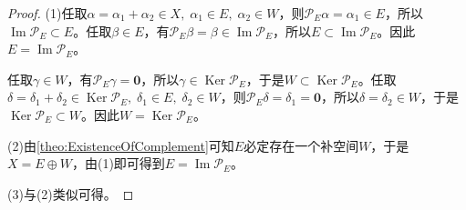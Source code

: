 \begin{proof}
	(1)任取$\alpha=\alpha_1+\alpha_2\in X,\;\alpha_1\in E,\;\alpha_2\in W$，则$\mathcal{P}_E\alpha=\alpha_1\in E$，所以$\operatorname{Im}\mathcal{P}_E\subset E$。任取$\beta\in E$，有$\mathcal{P}_E\beta=\beta\in\operatorname{Im}\mathcal{P}_E$，所以$E\subset\operatorname{Im}\mathcal{P}_E$。因此$E=\operatorname{Im}\mathcal{P}_E$。\par
	任取$\gamma\in W$，有$\mathcal{P}_E\gamma=\mathbf{0}$，所以$\gamma\in\operatorname{Ker}\mathcal{P}_E$，于是$W\subset\operatorname{Ker}\mathcal{P}_E$。任取$\delta=\delta_1+\delta_2\in\operatorname{Ker}\mathcal{P}_E,\;\delta_1\in E,\;\delta_2\in W$，则$\mathcal{P}_E\delta=\delta_1=\mathbf{0}$，所以$\delta=\delta_2\in W$，于是$\operatorname{Ker}\mathcal{P}_E\subset W$。因此$W=\operatorname{Ker}\mathcal{P}_E$。\par
	(2)由\cref{theo:ExistenceOfComplement}可知$E$必定存在一个补空间$W$，于是$X=E\oplus W$，由(1)即可得到$E=\operatorname{Im}\mathcal{P}_E$。\par
	(3)与(2)类似可得。
\end{proof}